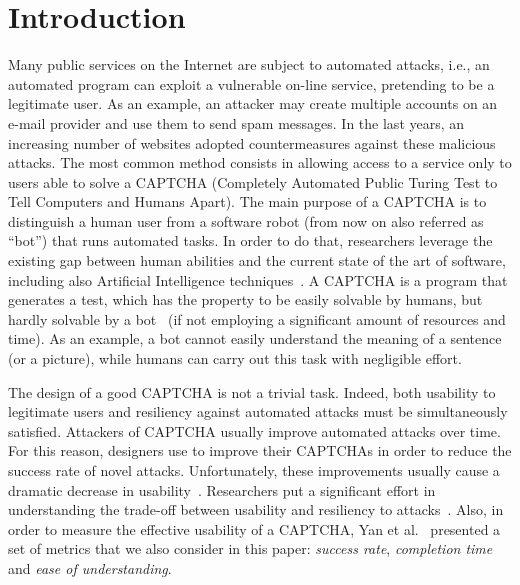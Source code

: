 \documentclass[conference]{IEEEtran}
\begin{document}
\section{Introduction}
Many public services on the Internet are subject to automated attacks, i.e., 
an automated program can exploit a vulnerable on-line service, pretending to be a legitimate user.
As an example, an attacker may create multiple accounts on an e-mail provider and use them to send spam messages. In the last years, an increasing number of websites adopted countermeasures against these malicious attacks.
The most common method consists in allowing access to a service only to users able to solve a CAPTCHA (Completely Automated Public Turing Test to Tell Computers and Humans Apart). The main purpose of a CAPTCHA is to distinguish a human user from a software robot (from now on also referred as ``bot'') that runs automated tasks.
In order to do that, researchers leverage the existing gap between human abilities and the current state of the art of software, including also Artificial Intelligence techniques~\cite{lopresti2005leveraging}. 
A CAPTCHA is a program that generates a test, which has the property to be easily solvable by humans, but hardly solvable by a bot~\cite{von2004telling}
(if not employing a significant amount of resources and time).
As an example, a bot cannot easily understand the meaning of a sentence (or a picture), while humans can carry out this task with negligible effort. 

The design of a good CAPTCHA is not a trivial task.
Indeed, both usability to legitimate users and resiliency against automated attacks must be simultaneously satisfied.
Attackers of CAPTCHA usually improve automated attacks over time.
For this reason, designers use to improve their CAPTCHAs in order to reduce the success rate of novel attacks.
Unfortunately, these improvements usually cause a dramatic decrease in usability~\cite{bursztein2010good}. Researchers put a significant effort in understanding the trade-off between usability and resiliency to attacks~\cite{ben2009experimental}. \label{usabilitymetrics}
Also, in order to measure the effective usability of a CAPTCHA, Yan et al.~\cite{yan2008usability} presented a set of metrics that we also consider in this paper: \textit{success rate}, \textit{completion time} and \textit{ease of understanding}.
\end{document}

